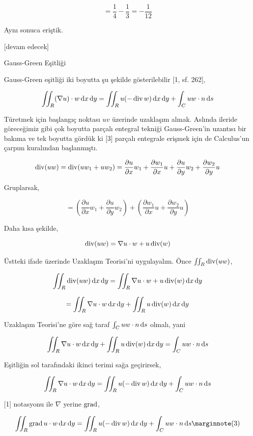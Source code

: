 \documentclass[12pt,fleqn]{article}\usepackage{../../common}
\begin{document}
$$
= \frac{1}{4} - \frac{1}{3} = -\frac{1}{12}
$$

Aynı sonuca eriştik.

[devam edecek]

Gauss-Green Eşitliği

Gauss-Green eşitliği iki boyutta şu şekilde gösterilebilir [1, sf. 262],

$$
\iint_R (\nabla u ) \cdot w \,\mathrm{d} x \,\mathrm{d} y =
\iint_R u (- \operatorname{div} w) \,\mathrm{d} x \,\mathrm{d} y + \int_C u w \cdot n \,\mathrm{d} s
$$

Türetmek için başlangıç noktası $uv$ üzerinde uzaklaşım almak. Aslında
ileride göreceğimiz gibi çok boyutta parçalı entegral tekniği Gauss-Green'in
uzantısı bir bakıma ve tek boyutta gördük ki [3] parçalı entegrale erişmek
için de Calculus'un çarpım kuralından başlanmıştı.

$$
\operatorname{div} (uw) = \operatorname{div} (u w_1 + u w_2) =
\frac{\partial u}{\partial x} w_1 +
\frac{\partial w_1}{\partial x} u +
\frac{\partial u}{\partial y} w_2 +
\frac{\partial w_2}{\partial y} u 
$$

Gruplarsak,

$$
= \left( 
\frac{\partial u}{\partial x} w_1 +
\frac{\partial u}{\partial y} w_2 \right) +
\left( 
\frac{\partial w_1}{\partial x} u +
\frac{\partial w_2}{\partial y} u \right)
$$

Daha kısa şekilde,

$$
\operatorname{div} (uw) = \nabla u \cdot w + u \operatorname{div}(w)
$$

Üstteki ifade üzerinde Uzaklaşım Teorisi'ni uygulayalım. Önce
$\iint_R \operatorname{div} (uw)$,

$$
\iint_R \operatorname{div} (uw) \,\mathrm{d} x \,\mathrm{d} y= \iint_R \nabla u \cdot w + u \operatorname{div}(w) \,\mathrm{d} x \,\mathrm{d} y
$$

$$
= \iint_R \nabla u \cdot w  \,\mathrm{d} x \,\mathrm{d} y + \iint_R u \operatorname{div}(w) \,\mathrm{d} x \,\mathrm{d} y
$$

Uzaklaşım Teorisi'ne göre sağ taraf $\int_C uw \cdot n \,\mathrm{d} s$ olmalı, yani

$$
\iint_R \nabla u \cdot w  \,\mathrm{d} x \,\mathrm{d} y + \iint_R u \operatorname{div}(w) \,\mathrm{d} x \,\mathrm{d} y = \int_C uw \cdot n \,\mathrm{d} s
$$

Eşitliğin sol tarafındaki ikinci terimi sağa geçirirsek,

$$
\iint_R \nabla u \cdot w  \,\mathrm{d} x \,\mathrm{d} y =
\iint_R u (-\operatorname{div} w) \,\mathrm{d} x \,\mathrm{d} y + \int_C uw \cdot n \,\mathrm{d} s
$$

[1] notasyonu ile $\nabla$ yerine $\operatorname{grad}$,

$$
\iint_R \grad u \cdot w  \ud x \ud y =
\iint_R u (-\bdiv w) \ud x \ud y + \int_C uw \cdot n \ud s
\mlabel{3}
$$
\end{document}
